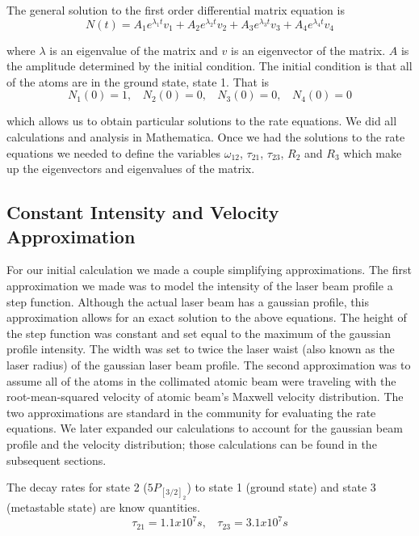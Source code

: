 \documentclass[prb,preprint]{revtex4-1}
\begin{document}
The general solution to the first order differential matrix equation is
\begin{equation}
\label{RateEqSol}
N(t) = A_1e^{\lambda_1 t} v_1 + A_2e^{\lambda_2 t} v_2 + A_3e^{\lambda_3 t} v_3 + A_4e^{\lambda_4 t} v_4 
\end{equation}

where $\lambda$ is an eigenvalue of the matrix and $v$ is an eigenvector of the matrix. $A$ is the amplitude determined by the initial condition. The initial condition is that all of the atoms are in the ground state, state 1. That is
\begin{equation}
\label{InitialCond}
N_1(0) = 1, \	\	\	\	
N_2(0) = 0, \	\	\	\	
N_3(0) = 0, \	\	\	\	
N_4(0) = 0 
\end{equation}

which allows us to obtain particular solutions to the rate equations. We did all calculations and analysis in Mathematica. Once we had the solutions to the rate equations we needed to define the variables $\omega_{12}$, $\tau_{21}$, $\tau_{23}$, $R_2$ and $R_3$ which make up the eigenvectors and eigenvalues of the matrix.

\subsection{Constant Intensity and Velocity Approximation} 

For our initial calculation we made a couple simplifying approximations. The first approximation we made was to model the intensity of the laser beam profile a step function.  Although the actual laser beam has a gaussian profile, this approximation allows for an exact solution to the above equations.  The height of the step function was constant and set equal to the maximum of the gaussian profile intensity. The width was set to twice the laser waist (also known as the laser radius) of the gaussian laser beam profile.  The second approximation was to assume all of the atoms in the collimated atomic beam were traveling with the root-mean-squared velocity of atomic beam's Maxwell velocity distribution.  The two approximations are standard in the community for evaluating the rate equations.  We later expanded our calculations to account for the gaussian beam profile and the velocity distribution; those calculations can be found in the subsequent sections. 

The decay rates for state 2 ($5P_{[3/2]_2}$) to state 1 (ground state) and state 3 (metastable state) are know quantities.~\cite{KrTransitions}
\begin{equation}
\label{DecayRates} 
\tau_{21} = 1.1x10^7 s, \	\	\	\	 \tau_{23} = 3.1x10^7s
\end{equation} 
\end{document}
